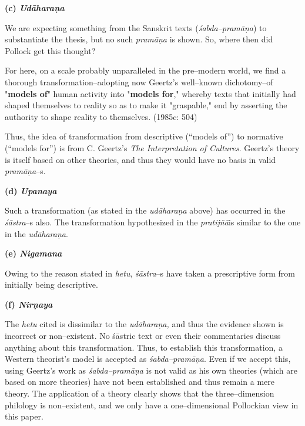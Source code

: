 \textbf{(c) \textit{Udāharaṇa}}

We are expecting something from the Sanskrit texts (\textit{śabda–pramāṇa}) to substantiate the thesis, but no such \textit{pramāṇa} is shown. So, where then did Pollock get this thought?

\begin{myquote}
For here, on a scale probably unparalleled in the pre–modern world, we find a thorough transformation–adopting now Geertz's well–known dichotomy–of "\textbf{models of}" human activity into "\textbf{models for}," whereby texts that initially had shaped themselves to reality so as to make it "graspable," end by asserting the authority to shape reality to themselves. (1985c: 504)
\end{myquote}

Thus, the idea of transformation from descriptive (“models of”) to normative (“models for”) is from C. Geertz’s \textit{The Interpretation of Cultures}. Geertz’s theory is itself based on other theories, and thus they would have no basis in valid\textit{ pramāṇa}–s.

\textbf{(d) \textit{Upanaya}}

Such a transformation (as stated in the \textit{udāharaṇa} above) has occurred in the \textit{śāstra}–s also. The transformation hypothesized in the \textit{pratijñā}is similar to the one in the\textit{ udāharaṇa}.

\newpage

\textbf{(e) \textit{Nigamana}}

Owing to the reason stated in \textit{hetu}, \textit{śāstra}–s have taken a prescriptive form from initially being descriptive.

\textbf{(f) \textit{Nirṇaya}}

The \textit{hetu} cited is dissimilar to the\textit{ udāharaṇa, }and thus the evidence shown is incorrect or non–existent. No śāstric text or even their commentaries discuss anything about this transformation. Thus, to establish this transformation, a Western theorist’s model is accepted as \textit{śabda–pramāṇa}. Even if we accept this, using Geertz’s work as \textit{śabda–pramāṇa} is not valid as his own theories (which are based on more theories) have not been established and thus remain a mere theory. The application of a theory clearly shows that the three–dimension philology is non–existent, and we only have a one–dimensional Pollockian view in this paper.

